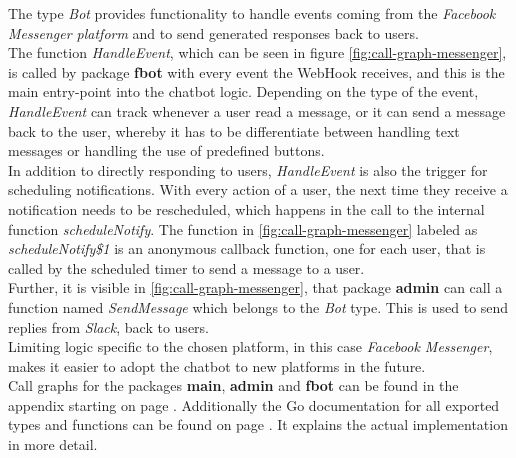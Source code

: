 The type \emph{Bot} provides functionality to handle events coming from the \emph{Facebook Messenger platform}
and to send generated responses back to users.
\\
The function \emph{HandleEvent}, which can be seen in figure \ref{fig:call-graph-messenger},
is called by package \textbf{fbot} with every event the WebHook receives,
and this is the main entry-point into the chatbot logic.
Depending on the type of the event,
\emph{HandleEvent} can track whenever a user read a message,
or it can send a message back to the user,
whereby it has to be differentiate between handling text messages
or handling the use of predefined buttons.
\\

In addition to directly responding to users,
\emph{HandleEvent} is also the trigger for scheduling notifications.
With every action of a user, the next time they receive a notification needs to be rescheduled,
which happens in the call to the internal function \emph{scheduleNotify}.
The function in \ref{fig:call-graph-messenger} labeled as \emph{scheduleNotify\$1} is an anonymous callback function,
one for each user, that is called by the scheduled timer to send a message to a user.
\\

Further, it is visible in \ref{fig:call-graph-messenger},
that package \textbf{admin} can call a function named \emph{SendMessage} which belongs to the \emph{Bot} type.
This is used to send replies from \emph{Slack}, back to users.
\\

Limiting logic specific to the chosen platform, in this case \emph{Facebook Messenger},
makes it easier to adopt the chatbot to new platforms in the future.
\\

Call graphs for the packages \textbf{main}, \textbf{admin} and \textbf{fbot} can be found in the appendix starting on page \pageref{a:call-graph}.
Additionally the Go documentation for all exported types and functions can be found on page \pageref{a:docs}.
It explains the actual implementation in more detail.
\\


